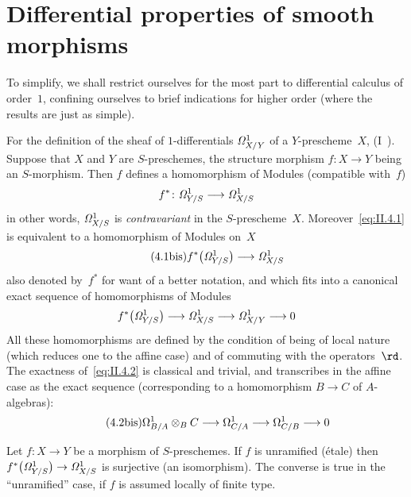 \section{Differential properties of smooth morphisms}
\label{II.4}

To simplify, we shall restrict ourselves for the most part to
differential calculus of order~$1$, confining ourselves to brief
indications for higher order (where the results are just as simple).

For the definition of the sheaf of $1$-differentials
$\it{\Omega}^1_{X/Y}$ of a $Y$-prescheme~$X$,
\cf (I~\No{}). Suppose that $X$ and $Y$ are
$S$-preschemes, the structure morphism $f\colon X\to Y$
being an $S$-morphism. Then $f$ defines a homomorphism of
Modules (compatible with~$f$)
\begin{equation}
\label{eq:II.4.1}
f^*\colon \it{\Omega}^1_{Y/S}\to\it{\Omega}^1_{X/S}
\end{equation}
in other words, $\it{\Omega}^1_{X/S}$ is \emph{contravariant} in
the $S$-prescheme~$X$. Moreover~\eqref{eq:II.4.1}
is equivalent to a homomorphism of Modules on~$X$
\begin{equation*}
\label{eq:II.4.1bis}
\tag{4.1\textrm{bis}}
f^*\big(\it{\Omega}^1_{Y/S}\big)\to\it{\Omega}^1_{X/S}
\end{equation*}
also denoted by~$f^*$ for want of a better notation, and
which fits into a canonical exact sequence of homomorphisms of
Modules
\begin{equation}
\label{eq:II.4.2}
f^*\big(\it{\Omega}^1_{Y/S}\big)\to
\it{\Omega}^1_{X/S}\to\it{\Omega}^1_{X/Y}\to 0
\end{equation}
All these homomorphisms are defined by the condition of being of
local nature (which reduces one to the affine case) and of commuting
with the operators~$\rd$. The exactness of~\eqref{eq:II.4.2} is
classical and trivial, and transcribes in the affine case as the
exact sequence (corresponding to a homomorphism $B\to C$ of
$A$-algebras):
\begin{equation*}
\label{eq:II.4.2bis}
\tag{4.2\textrm{bis}}
\Omega^1_{B/A}\otimes_{B}C\to\Omega^1_{C/A}\to\Omega^1_{C/B}\to 0
\end{equation*}

\begin{lemma}
\label{II.4.1}
Let
$f\colon X\to Y$ be a morphism of $S$-preschemes. If $f$
is unramified (\resp \'etale) then
$f^*\big(\it{\Omega}^1_{Y/S}\big)\to\it{\Omega}^1_{X/S}$
is surjective (\resp an isomorphism). The converse is true
in the ``unramified'' case, if $f$ is assumed locally of
finite type.
\end{lemma}

